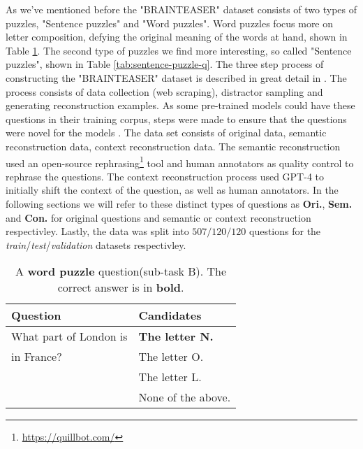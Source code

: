 As we've mentioned before the "BRAINTEASER" dataset consists of two types of puzzles, "Sentence puzzles" and "Word puzzles".
Word puzzles focus more on letter composition, defying the original meaning of the words at hand, shown in Table \ref{tab:word-puzzle-q}.
The second type of puzzles we find more interesting, so called "Sentence puzzles", shown in Table \ref{tab:sentence-puzzle-q}.
The three step process of constructing the "BRAINTEASER" dataset is described in great detail in \citep{semeval}.
The process consists of data collection (web scraping), distractor sampling and generating reconstruction examples.
As some pre-trained models could have these questions in their training corpus, steps were made to ensure that the questions were novel for the models \cite{fine-tune}.
The data set consists of original data, semantic reconstruction data, context reconstruction data.
The semantic reconstruction used an open-source rephrasing\footnote[2]{\url{https://quillbot.com/}} tool and human annotators as quality control to rephrase the questions. The context reconstruction process used GPT-4 to initially shift the context of the question, as well as human annotators. 
In the following sections we will refer to these distinct types of questions as \textbf{Ori.}, \textbf{Sem.} and \textbf{Con.} for original questions and semantic or context reconstruction respectivley.
Lastly, the data was split into $507/120/120$ questions for the \textit{train}/\textit{test}/\textit{validation} datasets respectivley.
\begin{table}
	\caption{A \textbf{word puzzle} question(sub-task B). The correct answer is in \textbf{bold}.}
	\label{tab:word-puzzle-q}
	\begin{center}
		\begin{tabular}{p{3.5cm}|p{3.5cm}}
			\toprule
			Question               & Candidates             \\
			\midrule
			What part of London is & \textbf{The letter N.} \\
			in France?             & The letter O.          \\
			                       & The letter L.          \\
			                       & None of the above.     \\
			\bottomrule
		\end{tabular}
	\end{center}
\end{table}

